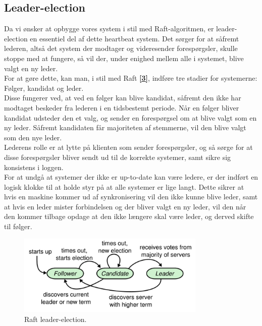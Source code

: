 \documentclass[a4paper,12pt]{article}
\begin{document}
\subsection{Leader-election} 
Da vi ønsker at opbygge vores system i stil med Raft-algoritmen, er leader-election en essentiel del af dette heartbeat system. Det sørger for at såfremt lederen, altså det system der modtager og videresender forespørgsler, skulle stoppe med at fungere, så vil der, under enighed mellem alle i systemet, blive valgt en ny leder.
\\
For at gøre dette, kan man, i stil med Raft \hyperref[tre]{\textbf{[3]}}, indføre tre stadier for systemerne:
\\
Følger, kandidat og leder.
\\[5px]
Disse fungerer ved, at ved en følger kan blive kandidat, såfremt den ikke har modtaget beskeder fra lederen i en tidsbestemt periode. Når en følger bliver kandidat udsteder den et valg, og sender en forespørgsel om at blive valgt som en ny leder. Såfremt kandidaten får majoriteten af stemmerne, vil den blive valgt som den nye leder.
\\
Lederens rolle er at lytte på klienten som sender forespørgsler, og så sørge for at disse forespørgsler bliver sendt ud til de korrekte systemer, samt sikre sig konsistens i loggen.
\\
For at undgå at systemer der ikke er up-to-date kan være ledere, er der indført en logisk klokke til at holde styr på at alle systemer er lige langt. 
Dette sikrer at hvis en maskine kommer ud af synkronisering vil den ikke kunne blive leder, samt at hvis en leder mister forbindelsen og der bliver valgt en ny leder, vil den når den kommer tilbage opdage at den ikke længere skal være leder, og derved skifte til følger.
\\
\begin{figure}[H]
  \caption{Raft leader-election.}
  \centering
    \includegraphics[width=0.8\textwidth]{Raftleaderelection.png}
\end{figure}
\end{document}
